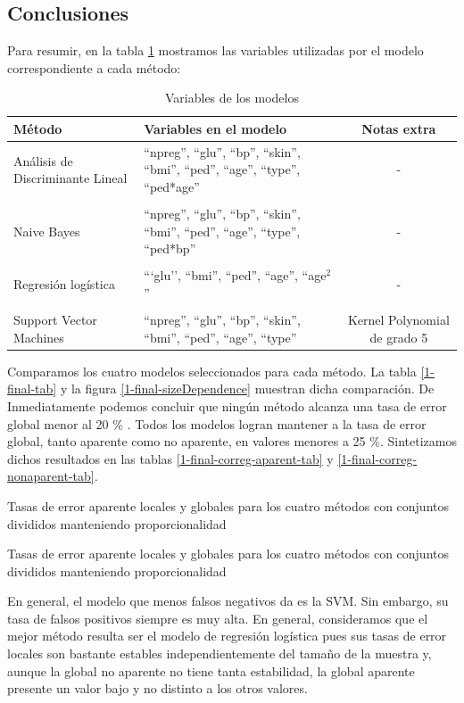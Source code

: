 \documentclass[11pt]{article}
\begin{document}
\subsection{Conclusiones}
Para resumir, en la tabla \ref{1-var} mostramos las variables utilizadas por el modelo correspondiente a cada método:
\begin{table}
    \centering
    \begin{tabular}{p{3cm}|p{5cm} | c}
        Método & Variables en el modelo & Notas extra\\
        \hline
        Análisis de Discriminante Lineal & ``npreg'', ``glu'', ``bp'', ``skin'', ``bmi'', ``ped'', ``age'', ``type'', ``ped*age'' & -\\
        & & \\
        Naive Bayes & ``npreg'', ``glu'', ``bp'', ``skin'', ``bmi'', ``ped'', ``age'', ``type'', ``ped*bp'' & -\\
        & & \\
        Regresión logística & ```glu'', ``bmi'', ``ped'',  ``age'',  ``age$^2$'' & - \\
        & & \\
        Support Vector Machines & ``npreg'', ``glu'', ``bp'', ``skin'', ``bmi'', ``ped'', ``age'', ``type'' & Kernel Polynomial de grado 5 \\
    \end{tabular}
    \caption{Variables de los modelos}
    \label{1-var}
\end{table}
Comparamos los cuatro modelos seleccionados para cada método. La tabla \ref{1-final-tab} y  la figura \ref{1-final-sizeDependence} muestran dicha comparación. De Inmediatamente podemos concluir que ningún método alcanza una tasa de error global menor al 20 \% . Todos los modelos logran mantener a la tasa de error global, tanto aparente como no aparente, en valores menores a 25 \%. Sintetizamos dichos resultados en las tablas \ref{1-final-correg-aparent-tab} y \ref{1-final-correg-nonaparent-tab}.

\begin{table}[H]
    \caption{Tasas de error aparente locales y globales para los cuatro métodos con conjuntos divididos manteniendo proporcionalidad}
    \label{1-final-correg-aparent-tab}
\end{table}
\pagebreak

\begin{table}[H]
    \caption{Tasas de error aparente locales y globales para los cuatro métodos con conjuntos divididos manteniendo proporcionalidad}
    \label{1-final-correg-nonaparent-tab}
\end{table}
En general, el modelo que menos falsos negativos da es la SVM. Sin embargo, su tasa de falsos positivos siempre es muy alta. En general, consideramos que el mejor método resulta ser el modelo de regresión logística pues sus tasas de error locales son bastante estables independientemente del tamaño de la muestra y, aunque la global no aparente no tiene tanta estabilidad, la global aparente presente un valor bajo y no distinto a los otros valores.
\pagebreak
\end{document}
